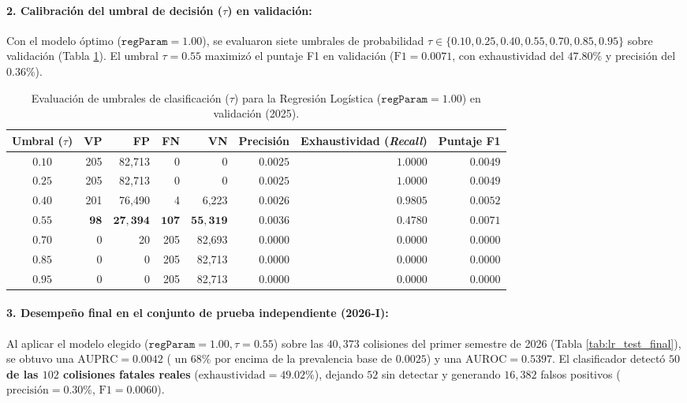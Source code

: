 \documentclass[11pt,a4paper]{article}
\begin{document}
\paragraph{2. Calibración del umbral de decisión ($\tau$) en validación:}
Con el modelo óptimo ($\texttt{regParam} = 1.00$), se evaluaron siete umbrales de probabilidad $\tau \in \{0.10, 0.25, 0.40, 0.55, 0.70, 0.85, 0.95\}$ sobre validación (Tabla \ref{tab:lr_umbrales_val}). El umbral $\tau = 0.55$ maximizó el puntaje F1 en validación ($\text{F1} = 0.0071$, con exhaustividad del $47.80\%$ y precisión del $0.36\%$).

\begin{table}[H]
\centering
\small
\renewcommand{\arraystretch}{1.2}
\caption{Evaluación de umbrales de clasificación ($\tau$) para la Regresión Logística ($\texttt{regParam}=1.00$) en validación (2025).}
\label{tab:lr_umbrales_val}
\begin{tabular}{c r r r r r r r}
\toprule
\textbf{Umbral ($\tau$)} & \textbf{VP} & \textbf{FP} & \textbf{FN} & \textbf{VN} & \textbf{Precisión} & \textbf{Exhaustividad (\textit{Recall})} & \textbf{Puntaje F1} \\
\midrule
$0.10$ & 205 & 82,713 & 0 & 0 & $0.0025$ & $1.0000$ & $0.0049$ \\
$0.25$ & 205 & 82,713 & 0 & 0 & $0.0025$ & $1.0000$ & $0.0049$ \\
$0.40$ & 201 & 76,490 & 4 & 6,223 & $0.0026$ & $0.9805$ & $0.0052$ \\
$\mathbf{0.55}$ & $\mathbf{98}$ & $\mathbf{27,394}$ & $\mathbf{107}$ & $\mathbf{55,319}$ & $\mathbf{0.0036}$ & $\mathbf{0.4780}$ & $\mathbf{0.0071}$ \\
$0.70$ & 0 & 20 & 205 & 82,693 & $0.0000$ & $0.0000$ & $0.0000$ \\
$0.85$ & 0 & 0 & 205 & 82,713 & $0.0000$ & $0.0000$ & $0.0000$ \\
$0.95$ & 0 & 0 & 205 & 82,713 & $0.0000$ & $0.0000$ & $0.0000$ \\
\bottomrule
\end{tabular}
\end{table}

\paragraph{3. Desempeño final en el conjunto de prueba independiente (2026-I):}
Al aplicar el modelo elegido ($\texttt{regParam} = 1.00, \tau = 0.55$) sobre las $40,373$ colisiones del primer semestre de 2026 (Tabla \ref{tab:lr_test_final}), se obtuvo una \textbf{$\text{AUPRC} = 0.0042$} ( un $68\%$ por encima de la prevalencia base de $0.0025$) y una \textbf{$\text{AUROC} = 0.5397$}. El clasificador detectó \textbf{$50$ de las $102$ colisiones fatales reales} ($\text{exhaustividad} = 49.02\%$), dejando $52$ sin detectar y generando $16,382$ falsos positivos ($\text{precisión} = 0.30\%$, $\text{F1} = 0.0060$).
\end{document}
